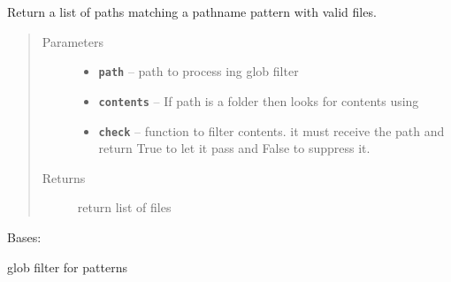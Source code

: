 \documentclass[letterpaper,10pt,english]{sphinxmanual}
\begin{document}

\begin{fulllineitems}
\label{RRtoolbox.lib:RRtoolbox.lib.root.glob}
Return a list of paths matching a pathname pattern with valid files.
\begin{quote}\begin{description}
\item[{Parameters}] \leavevmode\begin{itemize}
\item {} 
\textbf{\texttt{path}} -- path to process ing glob filter

\item {} 
\textbf{\texttt{contents}} -- If path is a folder then looks for contents using

\item {} 
\textbf{\texttt{check}} -- function to filter contents. it must receive the path
and return True to let it pass and False to suppress it.

\end{itemize}

\item[{Returns}] \leavevmode
return list of files

\end{description}\end{quote}

\end{fulllineitems}


\begin{fulllineitems}
\label{RRtoolbox.lib:RRtoolbox.lib.root.globFilter}
Bases: 

glob filter for patterns

\end{fulllineitems}

\end{document}
